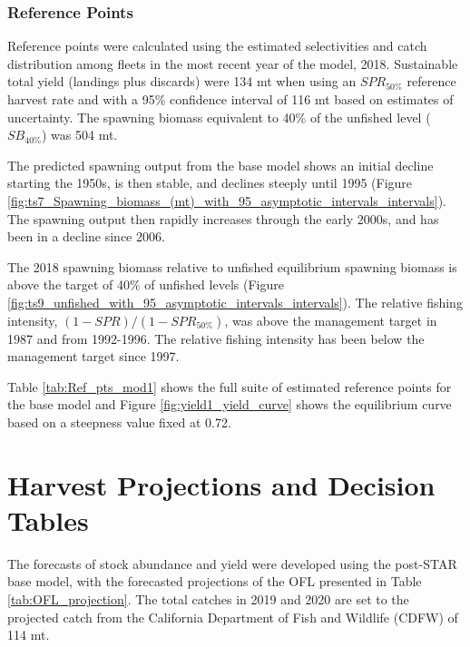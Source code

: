 \documentclass[12pt,]{article}
\begin{document}
\subsubsection{Reference Points}\label{reference-points-1}

Reference points were calculated using the estimated selectivities and
catch distribution among fleets in the most recent year of the model,
2018. Sustainable total yield (landings plus discards) were 134 mt when
using an \(SPR_{50\%}\) reference harvest rate and with a 95\%
confidence interval of 116 mt based on estimates of uncertainty. The
spawning biomass equivalent to 40\% of the unfished level
(\(SB_{40\%}\)) was 504 mt.

The predicted spawning output from the base model shows an initial
decline starting the 1950s, is then stable, and declines steeply until
1995 (Figure
\ref{fig:ts7_Spawning_biomass_(mt)_with_95_asymptotic_intervals_intervals}).\\
The spawning output then rapidly increases through the early 2000s, and
has been in a decline since 2006.

The 2018 spawning biomass relative to unfished equilibrium spawning
biomass is above the target of 40\% of unfished levels (Figure
\ref{fig:ts9_unfished_with_95_asymptotic_intervals_intervals}). The
relative fishing intensity, \((1-SPR)/(1-SPR_{50\%})\), was above the
management target in 1987 and from 1992-1996. The relative fishing
intensity has been below the management target since 1997.

Table \ref{tab:Ref_pts_mod1} shows the full suite of estimated reference
points for the base model and Figure \ref{fig:yield1_yield_curve} shows
the equilibrium curve based on a steepness value fixed at 0.72.

\section{Harvest Projections and Decision
Tables}\label{harvest-projections-and-decision-tables}

The forecasts of stock abundance and yield were developed using the
post-STAR base model, with the forecasted projections of the OFL
presented in Table \ref{tab:OFL_projection}. The total catches in 2019
and 2020 are set to the projected catch from the California Department
of Fish and Wildlife (CDFW) of 114 mt.
\end{document}
